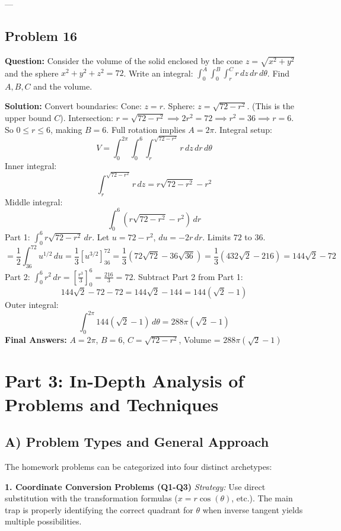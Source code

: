 \documentclass[11pt]{article}
\begin{document}
---

\subsection*{Problem 16}
\textbf{Question:} Consider the volume of the solid enclosed by the cone $z = \sqrt{x^2 + y^2}$ and the sphere $x^2 + y^2 + z^2 = 72$. Write an integral: $\int_0^A \int_0^B \int_r^C r \, dz \, dr \, d\theta$. Find $A, B, C$ and the volume.

\textbf{Solution:}
Convert boundaries:
Cone: $z = r$.
Sphere: $z = \sqrt{72 - r^2}$. (This is the upper bound $C$).
Intersection: $r = \sqrt{72 - r^2} \implies 2r^2 = 72 \implies r^2 = 36 \implies r = 6$. So $0 \leq r \leq 6$, making $B = 6$.
Full rotation implies $A = 2\pi$.
Integral setup:
\[ V = \int_0^{2\pi} \int_0^6 \int_r^{\sqrt{72-r^2}} r \, dz \, dr \, d\theta \]
Inner integral:
\[ \int_r^{\sqrt{72-r^2}} r \, dz = r\sqrt{72-r^2} - r^2 \]
Middle integral:
\[ \int_0^6 (r\sqrt{72-r^2} - r^2) \, dr \]
Part 1: $\int_0^6 r\sqrt{72-r^2} \, dr$. Let $u=72-r^2$, $du=-2r \, dr$. Limits $72$ to $36$.
\[ = \frac{1}{2} \int_{36}^{72} u^{1/2} \, du = \frac{1}{3} [u^{3/2}]_{36}^{72} = \frac{1}{3}(72\sqrt{72} - 36\sqrt{36}) = \frac{1}{3}(432\sqrt{2} - 216) = 144\sqrt{2} - 72 \]
Part 2: $\int_0^6 r^2 \, dr = \left[\frac{r^3}{3}\right]_0^6 = \frac{216}{3} = 72$.
Subtract Part 2 from Part 1:
\[ 144\sqrt{2} - 72 - 72 = 144\sqrt{2} - 144 = 144(\sqrt{2} - 1) \]
Outer integral:
\[ \int_0^{2\pi} 144(\sqrt{2} - 1) \, d\theta = 288\pi(\sqrt{2} - 1) \]
\textbf{Final Answers:}
$A = 2\pi$, $B = 6$, $C = \sqrt{72-r^2}$, Volume = $288\pi(\sqrt{2} - 1)$

\newpage
\section{Part 3: In-Depth Analysis of Problems and Techniques}

\subsection{A) Problem Types and General Approach}
The homework problems can be categorized into four distinct archetypes:

\textbf{1. Coordinate Conversion Problems (Q1-Q3)}
\textit{Strategy:} Use direct substitution with the transformation formulas ($x = r\cos(\theta)$, etc.). The main trap is properly identifying the correct quadrant for $\theta$ when inverse tangent yields multiple possibilities.
\end{document}
